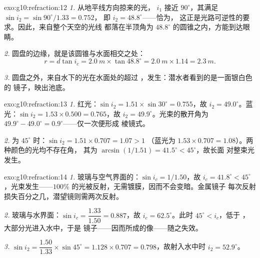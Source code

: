 \begin{solution}{exo:g10:refraction:12}
\emph{1.} 从地平线方向掠来的光， $i_1$ 接近
$90^\circ$，其满足 $\sin i_2 = \sin 90^\circ / 1.33 = 0.752$，
即 $i_2 = 48.8^\circ$——恰为，
这正是光路可逆性的要求。因此，来自整个天空的光线
都落在半顶角为 $48.8^\circ$ 的圆锥之内，方能到达眼睛。

\emph{2.} 圆盘的边缘，就是该圆锥与水面相交之处：
\[
r = d \tan i_c = \qty{2.0}{m} \times \tan 48.8^\circ
= \qty{2.0}{m} \times 1.14 = \qty{2.3}{m}.
\]

\emph{3.} 圆盘之外，来自水下的光在水面处的超过
，发生：潜水者看到的是一面银白色的
镜子，映出池底。
\end{solution}

\begin{solution}{exo:g10:refraction:13}
\emph{1.} 红光：$\sin i_2 = 1.51 \times \sin 30^\circ = 0.755$，故
$i_2 = 49.0^\circ$。蓝光：$\sin i_2 = 1.53 \times 0.500 = 0.765$，故
$i_2 = 49.9^\circ$。光束的散开角为
$49.9^\circ - 49.0^\circ = 0.9^\circ$——仅一次便形成
棱镜式。

\emph{2.} 为 $45^\circ$ 时：$\sin i_2 = 1.51 \times 0.707 = 1.07 > 1$
（蓝光为 $1.53 \times 0.707 = 1.08$）。两种颜色的光均不存在角，
其为
$\arcsin(1/1.51) = 41.5^\circ < 45^\circ$，故长面
对整束光发生。
\end{solution}

\begin{solution}{exo:g10:refraction:14}
\emph{1.} 玻璃与空气界面的：$\sin i_c = 1/1.50$，故
$i_c = 41.8^\circ < 45^\circ$，光束发生——$100\%$
的光被反射，无需镀膜，因而不会变暗。金属镜子
每次反射损失百分之几，潜望镜则需两次反射。

\emph{2.} 玻璃与水界面：$\sin i_c = \dfrac{1.33}{1.50} = 0.887$，故
$i_c = 62.5^\circ$。此时 $45^\circ < i_c$，低于
，大部分光进入水中，于是
镜子——因而所成的像——随之失效。

\emph{3.} $\sin i_2 = \dfrac{1.50}{1.33} \times \sin 45^\circ
= 1.128 \times 0.707 = 0.798$，故射入水中时 $i_2 = 52.9^\circ$。
\end{solution}

